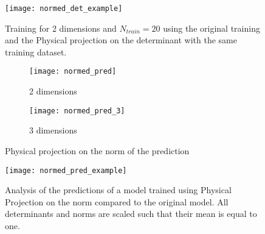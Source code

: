 \begin{figure}[H]
	\centering
	\texttt{[image: normed\_det\_example]}
	\caption{Training for 2 dimensions and $N_{train} = 20$ using the original training and the Physical projection on the determinant with the same training dataset.}
	\label{fig:normed_det_example}
\end{figure}

\begin{figure}[H]
	\centering
	\begin{subfigure}{.5\textwidth}
		\centering
		\texttt{[image: normed\_pred]}
		\caption{2 dimensions}
	\end{subfigure}%
	\begin{subfigure}{.5\textwidth}
		\centering
		\texttt{[image: normed\_pred\_3]}
		\caption{3 dimensions}
	\end{subfigure}
	\caption{Physical projection on the norm of the prediction}
	\label{fig:normed_pred}
\end{figure}

\begin{figure}[H]
	\centering
	\texttt{[image: normed\_pred\_example]}
	\caption{Analysis of the predictions of a model trained using Physical Projection on the norm compared to the original model. All determinants and norms are scaled such that their mean is equal to one.}
	\label{fig:normed_pred_example}
\end{figure}


\clearpage
